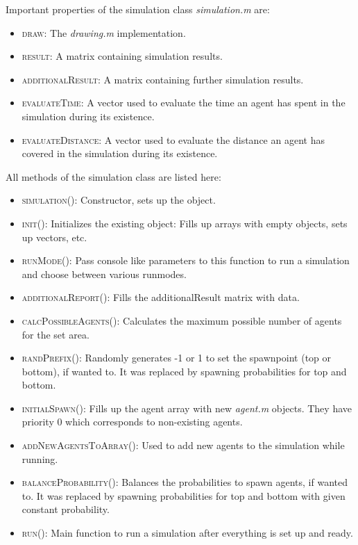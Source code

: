 \noi Important properties of the simulation class \textit{simulation.m} are:
\begin{itemize}
\item \textsc{draw}: The \textit{drawing.m} implementation.
\item \textsc{result}: A matrix containing simulation results.
\item \textsc{additionalResult}: A matrix containing further simulation results.
\item \textsc{evaluateTime}: A vector used to evaluate the time an agent has spent in the simulation during its existence. %
\item \textsc{evaluateDistance}: A vector used to evaluate the distance an agent has covered in the simulation during its existence. %
\end{itemize}

\noi All methods of the simulation class are listed here:
\begin{itemize}
\item \textsc{simulation()}: Constructor, sets up the object.
\item \textsc{init()}: Initializes the existing object: Fills up arrays with empty objects, sets up vectors, etc.
\item \textsc{runMode()}: Pass console like parameters to this function to run a simulation and choose between various runmodes.
\item \textsc{additionalReport()}: Fills the additionalResult matrix with data.
\item \textsc{calcPossibleAgents()}: Calculates the maximum possible number of agents for the set area. 
\item \textsc{randPrefix()}: Randomly generates -1 or 1 to set the spawnpoint (top or bottom), if wanted to. It was replaced by spawning probabilities for top and bottom.
\item \textsc{initialSpawn()}: Fills up the agent array with new \textit{agent.m} objects. They have priority 0 which corresponds to non-existing agents.
\item \textsc{addNewAgentsToArray()}: Used to add new agents to the simulation while running.
\item \textsc{balanceProbability()}: Balances the probabilities to spawn agents, if wanted to. It was replaced by spawning probabilities for top and bottom with given constant probability.
\item \textsc{run()}: Main function to run a simulation after everything is set up and ready.
\end{itemize}

